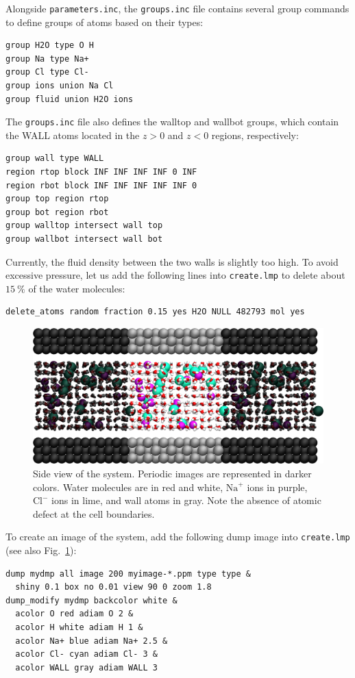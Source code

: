 \documentclass[9pt,tutorial]{livecoms}
\newcommand{\lmpcmd}[1]{\colorbox{listing}{\textcolor{command}{\small{#1}}}} %
\newcommand{\flecmd}[1]{\textcolor{command}{\texttt{#1}}} %
\begin{document}
Alongside \flecmd{parameters.inc}, the \flecmd{groups.inc} file contains
several \lmpcmd{group} commands to define groups of atoms based
on their types:
\begin{lstlisting}
group H2O type O H
group Na type Na+
group Cl type Cl-
group ions union Na Cl
group fluid union H2O ions
\end{lstlisting}
The \flecmd{groups.inc} file also defines the \lmpcmd{walltop} and \lmpcmd{wallbot}
groups, which contain the WALL atoms located in the $z > 0$ and $z < 0$ regions, respectively:
\begin{lstlisting}
group wall type WALL
region rtop block INF INF INF INF 0 INF
region rbot block INF INF INF INF INF 0
group top region rtop
group bot region rbot
group walltop intersect wall top
group wallbot intersect wall bot
\end{lstlisting}

Currently, the fluid density between the two walls is slightly too high.  To avoid
excessive pressure, let us add the following lines into \flecmd{create.lmp}
to delete about $15~\%$ of the water molecules:
\begin{lstlisting}
delete_atoms random fraction 0.15 yes H2O NULL 482793 mol yes
\end{lstlisting}

\begin{figure}
\centering
\includegraphics[width=\linewidth]{NANOSHEAR-system}
\caption{Side view of the system.  Periodic images are represented in darker colors.
Water molecules are in red and white, $\text{Na}^+$ ions in purple, $\text{Cl}^-$
ions in lime, and wall atoms in gray.  Note the absence of atomic defect at the
cell boundaries.}
\label{fig:NANOSHEAR-system}
\end{figure}

To create an image of the system, add the following \lmpcmd{dump} image
into \flecmd{create.lmp} (see also Fig.~\ref{fig:NANOSHEAR-system}):
\begin{lstlisting}
dump mydmp all image 200 myimage-*.ppm type type &
  shiny 0.1 box no 0.01 view 90 0 zoom 1.8
dump_modify mydmp backcolor white &
  acolor O red adiam O 2 &
  acolor H white adiam H 1 &
  acolor Na+ blue adiam Na+ 2.5 &
  acolor Cl- cyan adiam Cl- 3 &
  acolor WALL gray adiam WALL 3
\end{lstlisting}
\end{document}
